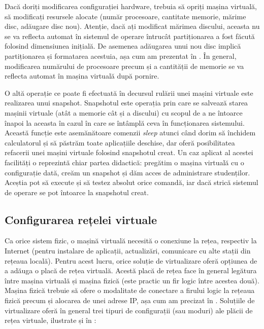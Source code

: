 Dacă doriți modificarea configurației hardware, trebuia să opriți mașina
virtuală, să modificați resursele alocate (număr procesoare, cantitate memorie,
mărime disc, adăugare disc nou). Atenție, dacă ați modificat mărimea discului,
aceasta nu se va reflecta automat în sistemul de operare întrucât partiționarea
a fost făcută folosind dimensiunea inițială. De asemenea adăugarea unui nou disc
implică partiționarea și formatarea acestuia, așa cum am prezentat în . În general, modificarea numărului
de procesoare precum și a cantității de memorie se va reflecta automat în mașina
virtuală după pornire.

O altă operație ce poate fi efectuată în decursul rulării unei mașini virtuale
este realizarea unui snapshot. Snapshotul este operația prin care se salvează starea mașinii
virtuale (atât a memorie cât și a discului) cu scopul de a ne întoarce înapoi la
aceasta în cazul în care se întâmplă ceva în funcționarea sistemului. Această
funcție este asemănătoare comenzii \textit{sleep} atunci când dorim să închidem
calculatorul și să păstrăm toate aplicațiile deschise, dar oferă posibilitatea
refacerii unei mașini virtuale folosind snapshotul creat. Un caz aplicat al
acestei facilități o reprezintă chiar partea didactică: pregătim o mașina
virtuală cu o configurație dată, creăm un snapshot și dăm acces de administrare
studenților. Aceștia pot să execute și să testez absolut orice comandă, iar dacă
strică sistemul de operare se pot întoarce la snapshotul creat.

\subsection{Configurarea rețelei virtuale}
\label{sec:vm:ops:net}

Ca orice sistem fizic, o mașină virtuală necesită o conexiune la rețea,
respectiv la Internet (pentru instalare de aplicații, actualizări, comunicare cu
alte stații din rețeaua locală). Pentru acest lucru, orice soluție de
virtualizare oferă opțiunea de a adăuga o placă de rețea virtuală. Acestă placă
de rețea face în general legătura între mașina virtuală și mașina fizică (este
practic un fir logic între acestea două). Mașina fizică trebuie să ofere o
modalitate de conectare a firului logic la rețeaua fizică precum și alocarea de
unei adrese IP, așa cum am precizat în . Soluțiile de
virtualizare oferă în general trei tipuri de configurații (sau moduri) ale
plăcii de rețea virtuale, ilustrate și în :

